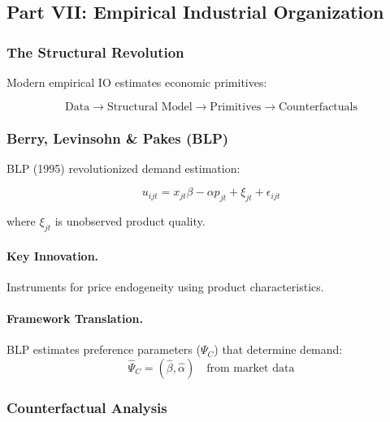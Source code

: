 \subsection{Part VII: Empirical Industrial Organization}

\subsubsection{The Structural Revolution}

Modern empirical IO estimates economic primitives:

\begin{equation}
\boxed{
\text{Data} \to \text{Structural Model} \to \text{Primitives} \to \text{Counterfactuals}
}
\label{eq:structural}
\end{equation}

\subsubsection{Berry, Levinsohn \& Pakes (BLP)}

BLP (1995) revolutionized demand estimation:

\begin{equation}
u_{ijt} = x_{jt}\beta - \alpha p_{jt} + \xi_{jt} + \epsilon_{ijt}
\end{equation}

where $\xi_{jt}$ is unobserved product quality.

\paragraph{Key Innovation.}
Instruments for price endogeneity using product characteristics.

\paragraph{Framework Translation.}
BLP estimates preference parameters ($\Psi_C$) that determine demand:
\begin{equation}
\hat{\Psi}_C = (\hat{\beta}, \hat{\alpha}) \quad \text{from market data}
\end{equation}

\subsubsection{Counterfactual Analysis}

